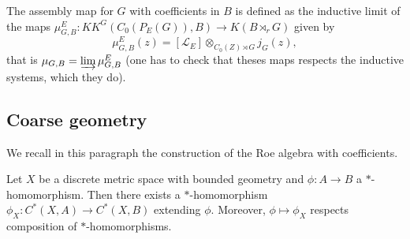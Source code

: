 \begin{definition}\label{projection}
The assembly map for $G$ with coefficients in $B$ is defined as the inductive limit of the maps $\mu_{G,B}^{E} : KK^G(C_0(P_E(G)),B)\rightarrow K(B\rtimes_r G)$ given by
\[\mu_{G,B}^{E} (z)=[\mathcal L_E]\otimes_{C_0(Z)\rtimes G} j_G(z),\]
that is $\mu_{G,B} = \varinjlim \mu_{G,B}^{E}$ (one has to check that theses maps respects the inductive systems, which they do).\\
\end{definition}

\subsection{Coarse geometry}

We recall in this paragraph the construction of the Roe algebra with coefficients.

\begin{thm}\label{Xfunctor}
Let $X$ be a discrete metric space with bounded geometry and $\phi : A\rightarrow B$ a $*$-homomorphism. Then there exists a $*$-homomorphism $\phi_X : C^*(X,A)\rightarrow C^*(X,B)$ extending $\phi$. Moreover, $\phi\mapsto \phi_X$ respects composition of $*$-homomorphisms.
\end{thm}



